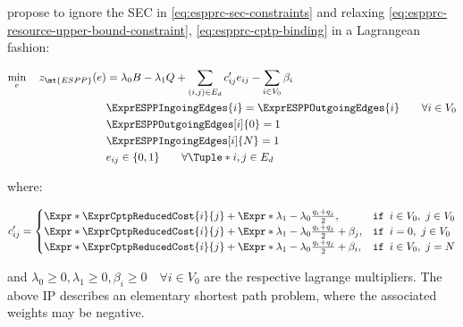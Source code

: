 \cite{beasley1989algorithm} propose to ignore the SEC in \eqref{eq:espprc-sec-constraints} and relaxing \eqref{eq:espprc-resource-upper-bound-constraint}, \eqref{eq:espprc-cptp-binding} in a Lagrangean fashion:

\begin{align}
	\min_{e} \quad z_\mt{ESPP}(e) & = \lambda_0 B - \lambda_1 Q + \sum_{(i, j) \in E_d}  c'_{ij} e_{ij} - \sum_{i \in V_0} \beta_i  \label{eq:esp-relaxed-obj-function} \\
	                              & \ExprESPPIngoingEdges{i} = \ExprESPPOutgoingEdges{i}        \qquad \forall i \in V_0                                                \\
	                              & \ExprESPPOutgoingEdges[i]{0} = 1                                                                                                    \\
	                              & \ExprESPPIngoingEdges[i]{N} = 1                                                                                                     \\
	                              & e_{ij}                   \in \lbrace 0, 1 \rbrace           \qquad \forall \Tuple*{i, j} \in E_d
\end{align}

where:

\begin{equation}
	c'_{ij} =
	\begin{cases}
		\Expr*{\ExprCptpReducedCost{i}{j}} + \Expr*{\lambda_1 - \lambda_0} \frac{q_i + q_j}{2},           & \texttt{if } i \in V_0,\ j \in V_0 \\
		\Expr*{\ExprCptpReducedCost{i}{j}} + \Expr*{\lambda_1 - \lambda_0} \frac{q_i + q_j}{2} + \beta_j, & \texttt{if } i = 0,\ j \in V_0     \\
		\Expr*{\ExprCptpReducedCost{i}{j}} + \Expr*{\lambda_1 - \lambda_0} \frac{q_i + q_j}{2} + \beta_i, & \texttt{if } i \in V_0,\ j = N
	\end{cases}
\end{equation}

and $\lambda_0 \ge 0, \lambda_1 \ge 0, \beta_i \ge 0 \quad \forall i \in V_0$ are the respective lagrange multipliers.
The above IP describes an elementary shortest path problem, where the associated weights may be negative.

